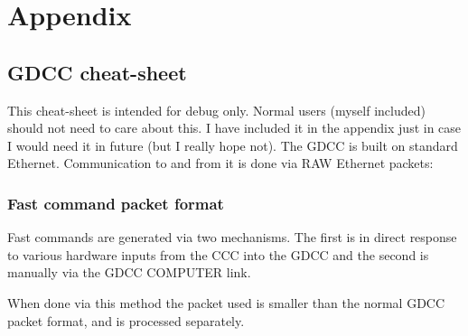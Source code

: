 \chapter{Appendix}
\section{GDCC cheat-sheet}\label{sec:gdcc-cheat-sheet}
This cheat-sheet is intended for debug only. Normal users (myself included)
should not need to care about this. I have included it in the appendix just in
case I would need it in future (but I really hope not). The GDCC is built on
standard Ethernet. Communication to and from it is done via RAW Ethernet
packets:
\subsection{Fast command packet format}
Fast commands are generated via two mechanisms. The first is in direct response
to various hardware inputs from the CCC into the GDCC and the second is manually
via the GDCC \textrightarrow COMPUTER link.

When done via this method the packet used is smaller than the normal GDCC packet
format, and is processed separately.
\begin{table}[ht]
  \centering {}
  \caption{Fast command packet format}
\end{table}

